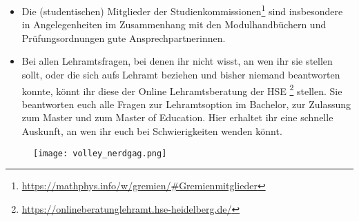\begin{itemize}
    \item Die (studentischen) Mitglieder der Studienkommissionen\footnote{\url{https://mathphys.info/w/gremien/\#Gremienmitglieder}} sind insbesondere in Angelegenheiten im Zusammenhang mit den Modulhandbüchern und Prüfungsordnungen gute Ansprechpartnerinnen.

    \item Bei allen Lehramtsfragen, bei denen ihr nicht wisst, an wen ihr sie stellen sollt, oder die sich aufs Lehramt beziehen und bisher niemand beantworten konnte, könnt ihr diese der Online Lehramtsberatung der HSE \footnote{\url{https://onlineberatunglehramt.hse-heidelberg.de/}} stellen. Sie beantworten euch alle Fragen zur Lehramtsoption im Bachelor, zur Zulassung zum Master und zum Master of Education. Hier erhaltet ihr eine schnelle Auskunft, an wen ihr euch bei Schwierigkeiten wenden könnt.


\end{itemize}



\begin{figure}[h]
    \centering
    \texttt{[image: volley\_nerdgag.png]}
\end{figure}

